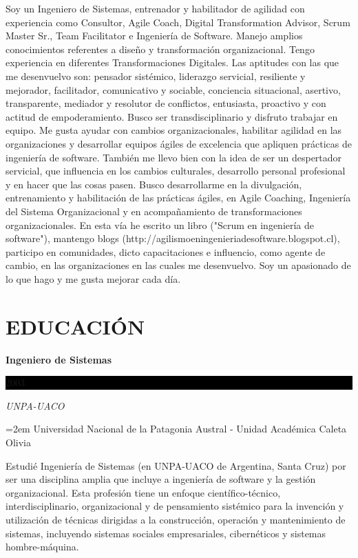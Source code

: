 \documentclass[paper=a4,fontsize=11pt]{scrartcl} %
\newcommand{\sepspace}{\vspace*{1em}}		%
\newcommand{\NewPart}[1]{\section*{\uppercase{#1}}}
\newcommand{\EducationEntry}[4]{
		\noindent \textbf{#1} \hfill      %
		\colorbox{Black}{%
			\parbox{6em}{%
			\hfill\color{White}#2}} \par  %
		\noindent \textit{#3} \par        %
		\noindent\hangindent=2em\hangafter=0 \small #4 %
		\normalsize \par}
\begin{document}
Soy un Ingeniero de Sistemas, entrenador y habilitador de agilidad con experiencia como Consultor, Agile Coach, Digital Transformation Advisor, Scrum Master Sr., Team Facilitator e Ingeniería de Software. Manejo amplios conocimientos referentes a diseño y transformación organizacional. Tengo experiencia en diferentes Transformaciones Digitales. Las aptitudes con las que me desenvuelvo son: pensador sistémico, liderazgo servicial, resiliente y mejorador, facilitador, comunicativo y sociable, conciencia situacional, asertivo, transparente, mediador y resolutor de conflictos, entusiasta, proactivo y con actitud de empoderamiento. Busco ser transdisciplinario y disfruto trabajar en equipo. Me gusta ayudar con cambios organizacionales, habilitar agilidad en las organizaciones y desarrollar equipos ágiles de excelencia que apliquen prácticas de ingeniería de software. También me llevo bien con la idea de ser un despertador servicial, que influencia en los cambios culturales, desarrollo personal profesional y en hacer que las cosas pasen. Busco desarrollarme en la divulgación, entrenamiento y habilitación de las prácticas ágiles, en Agile Coaching, Ingeniería del Sistema Organizacional y en acompañamiento de transformaciones organizacionales. En esta vía he escrito un libro ("Scrum en ingeniería de software"), mantengo blogs (http://agilismoeningenieriadesoftware.blogspot.cl), participo en comunidades, dicto capacitaciones e influencio, como agente de cambio, en las organizaciones en las cuales me desenvuelvo. Soy un apasionado de lo que hago y me gusta mejorar cada día.



\sepspace

\NewPart{Educación}{}

\EducationEntry{Ingeniero de Sistemas}{2003}{UNPA-UACO}
{Universidad Nacional de la Patagonia Austral - Unidad Académica Caleta Olivia}

Estudié Ingeniería de Sistemas (en UNPA-UACO de Argentina, Santa Cruz) por ser una disciplina amplia que incluye a ingeniería de software y la gestión organizacional. Esta profesión tiene un enfoque científico-técnico, interdisciplinario, organizacional y de pensamiento sistémico para la invención y utilización de técnicas dirigidas a la construcción, operación y mantenimiento de sistemas, incluyendo sistemas sociales empresariales, cibernéticos y sistemas hombre-máquina.
\sepspace
\end{document}
